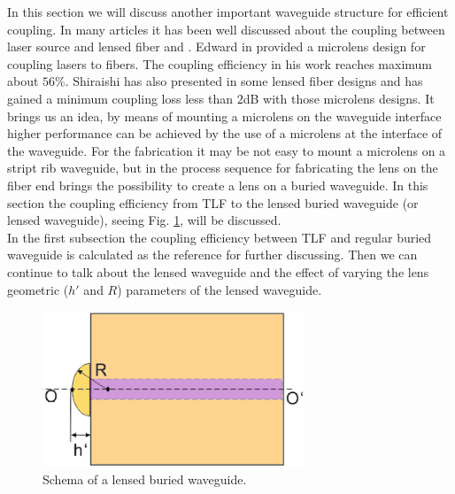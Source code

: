 
In this section we will discuss another important waveguide structure for efficient coupling. In many articles it has been well discussed about the coupling between laser source and lensed fiber\cite{microlensese_to_fiber_coupling} and \cite{integrated_coupling _between_LD_SMF}.  Edward in \cite{microlensese_to_fiber_coupling} provided a microlens design for coupling lasers to fibers. The coupling efficiency in his work reaches maximum about $56\%$. Shiraishi has also presented in \cite{integrated_coupling _between_LD_SMF} some lensed fiber designs and has gained a minimum coupling loss less than $2$dB with those microlens designs. It brings us an idea, by means of mounting a microlens on the waveguide interface higher performance can be achieved by the use of a microlens at the interface of the waveguide. For the fabrication it may be not easy to mount a microlens on a stript rib waveguide, but in \cite{lens_end_manufacture} the process sequence for fabricating the lens on the fiber end brings the possibility to create a lens on a buried waveguide. In this section the coupling efficiency from TLF to the lensed buried waveguide (or lensed waveguide), seeing Fig. \ref{fig:lensed_waveguide}, will be discussed.\\

In the first subsection the coupling efficiency between TLF and regular buried waveguide is calculated as the reference for further discussing. Then we can continue to talk about the lensed waveguide and the effect of varying the lens geometric ($h'$ and $R$) parameters of the lensed waveguide. \\

\begin{figure}[!ht]
\centering
\includegraphics[width=0.7\textwidth]{bilder/lensed_waveguide}
\caption{Schema of a lensed buried waveguide.}
\label{fig:lensed_waveguide}
\end{figure}